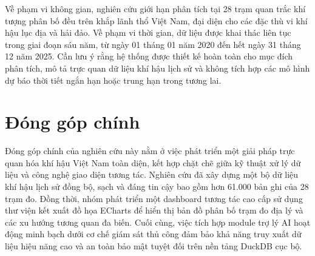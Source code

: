 Về phạm vi không gian, nghiên cứu giới hạn phân tích tại 28 trạm quan trắc khí tượng phân bố đều trên khắp lãnh thổ Việt Nam, đại diện cho các đặc thù vi khí hậu lục địa và hải đảo. Về phạm vi thời gian, dữ liệu được khai thác liên tục trong giai đoạn sáu năm, từ ngày 01 tháng 01 năm 2020 đến hết ngày 31 tháng 12 năm 2025. Cần lưu ý rằng hệ thống được thiết kế hoàn toàn cho mục đích phân tích, mô tả trực quan dữ liệu khí hậu lịch sử và không tích hợp các mô hình dự báo thời tiết ngắn hạn hoặc trung hạn trong tương lai.

\section{Đóng góp chính}
Đóng góp chính của nghiên cứu này nằm ở việc phát triển một giải pháp trực quan hóa khí hậu Việt Nam toàn diện, kết hợp chặt chẽ giữa kỹ thuật xử lý dữ liệu và công nghệ giao diện tương tác. Nghiên cứu đã xây dựng một bộ dữ liệu khí hậu lịch sử đồng bộ, sạch và đáng tin cậy bao gồm hơn 61.000 bản ghi của 28 trạm đo. Đồng thời, nhóm phát triển một dashboard tương tác cao cấp sử dụng thư viện kết xuất đồ họa ECharts để hiển thị bản đồ phân bố trạm đo địa lý và các xu hướng tương quan đa biến. Cuối cùng, việc tích hợp module trợ lý AI hoạt động minh bạch dưới cơ chế giám sát thủ công đảm bảo khả năng truy xuất dữ liệu hiệu năng cao và an toàn bảo mật tuyệt đối trên nền tảng DuckDB cục bộ.
